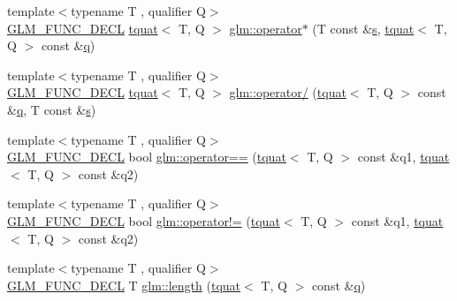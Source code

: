 \begin{DoxyCompactItemize}
\item 
{\footnotesize template$<$typename T , qualifier Q$>$ }\\\hyperlink{setup_8hpp_ab2d052de21a70539923e9bcbf6e83a51}{G\+L\+M\+\_\+\+F\+U\+N\+C\+\_\+\+D\+E\+CL} \hyperlink{structglm_1_1tquat}{tquat}$<$ T, Q $>$ \hyperlink{group__gtc__quaternion_ga4203f1da1798e6f6dd2549c6daec4e5a}{glm\+::operator$\ast$} (T const \&\hyperlink{_s_d_l__opengl_8h_a4af680a6c683f88ed67b76f207f2e6e4}{s}, \hyperlink{structglm_1_1tquat}{tquat}$<$ T, Q $>$ const \&\hyperlink{_s_d_l__opengl_8h_a8fc1e7b9baaae687804c7eed46ca09c6}{q})
\item 
{\footnotesize template$<$typename T , qualifier Q$>$ }\\\hyperlink{setup_8hpp_ab2d052de21a70539923e9bcbf6e83a51}{G\+L\+M\+\_\+\+F\+U\+N\+C\+\_\+\+D\+E\+CL} \hyperlink{structglm_1_1tquat}{tquat}$<$ T, Q $>$ \hyperlink{group__gtc__quaternion_ga077354a34d5111b6c904db7bf331a31f}{glm\+::operator/} (\hyperlink{structglm_1_1tquat}{tquat}$<$ T, Q $>$ const \&\hyperlink{_s_d_l__opengl_8h_a8fc1e7b9baaae687804c7eed46ca09c6}{q}, T const \&\hyperlink{_s_d_l__opengl_8h_a4af680a6c683f88ed67b76f207f2e6e4}{s})
\item 
{\footnotesize template$<$typename T , qualifier Q$>$ }\\\hyperlink{setup_8hpp_ab2d052de21a70539923e9bcbf6e83a51}{G\+L\+M\+\_\+\+F\+U\+N\+C\+\_\+\+D\+E\+CL} bool \hyperlink{group__gtc__quaternion_ga5892999628e2bcd46279c8df9be904b7}{glm\+::operator==} (\hyperlink{structglm_1_1tquat}{tquat}$<$ T, Q $>$ const \&q1, \hyperlink{structglm_1_1tquat}{tquat}$<$ T, Q $>$ const \&q2)
\item 
{\footnotesize template$<$typename T , qualifier Q$>$ }\\\hyperlink{setup_8hpp_ab2d052de21a70539923e9bcbf6e83a51}{G\+L\+M\+\_\+\+F\+U\+N\+C\+\_\+\+D\+E\+CL} bool \hyperlink{group__gtc__quaternion_ga82de7204717a61a57d1bd321902bb9c6}{glm\+::operator!=} (\hyperlink{structglm_1_1tquat}{tquat}$<$ T, Q $>$ const \&q1, \hyperlink{structglm_1_1tquat}{tquat}$<$ T, Q $>$ const \&q2)
\item 
{\footnotesize template$<$typename T , qualifier Q$>$ }\\\hyperlink{setup_8hpp_ab2d052de21a70539923e9bcbf6e83a51}{G\+L\+M\+\_\+\+F\+U\+N\+C\+\_\+\+D\+E\+CL} T \hyperlink{group__gtc__quaternion_gab33f82f8d1c9223d335aab752a126855}{glm\+::length} (\hyperlink{structglm_1_1tquat}{tquat}$<$ T, Q $>$ const \&\hyperlink{_s_d_l__opengl_8h_a8fc1e7b9baaae687804c7eed46ca09c6}{q})
\item 

\end{DoxyCompactItemize}

